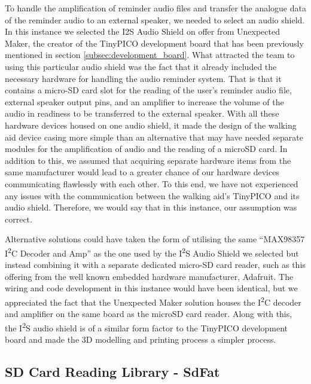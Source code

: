                     To handle the amplification of reminder audio files and transfer the analogue data of the reminder audio to an external speaker, we needed to select an audio shield. In this instance we selected the I2S Audio Shield \cite{unexpected_maker} on offer from Unexpected Maker, the creator of the TinyPICO development board that has been previously mentioned in section \ref{subsec:development_board}. What attracted the team to using this particular audio shield was the fact that it already included the necessary hardware for handling the audio reminder system. That is that it contains a micro-SD card slot for the reading of the user's reminder audio file, external speaker output pins, and an amplifier to increase the volume of the audio in readiness to be transferred to the external speaker. With all these hardware devices housed on one audio shield, it made the design of the walking aid device casing more simple than an alternative that may have needed separate modules for the amplification of audio and the reading of a microSD card. In addition to this, we assumed that acquiring separate hardware items from the same manufacturer would lead to a greater chance of our hardware devices communicating flawlessly with each other. To this end, we have not experienced any issues with the communication between the walking aid's TinyPICO and its audio shield. Therefore, we would say that in this instance, our assumption was correct.
                    
                    Alternative solutions could have taken the form of utilising the same ``MAX98357 I\textsuperscript{2}C Decoder and Amp'' \cite{unexpected_maker} as the one used by the I\textsuperscript{2}S Audio Shield we selected but instead combining it with a separate dedicated micro-SD card reader, such as this offering \cite{ada_2022} from the well known embedded hardware manufacturer, Adafruit. The wiring and code development in this instance would have been identical, but we appreciated the fact that the Unexpected Maker solution houses the I\textsuperscript{2}C decoder and amplifier on the same board as the microSD card reader. Along with this, the I\textsuperscript{2}S audio shield is of a similar form factor to the TinyPICO development board and made the 3D modelling and printing process a simpler process.
        
                \subsection{SD Card Reading Library - SdFat}
                \label{subsec:sdfat}
        
